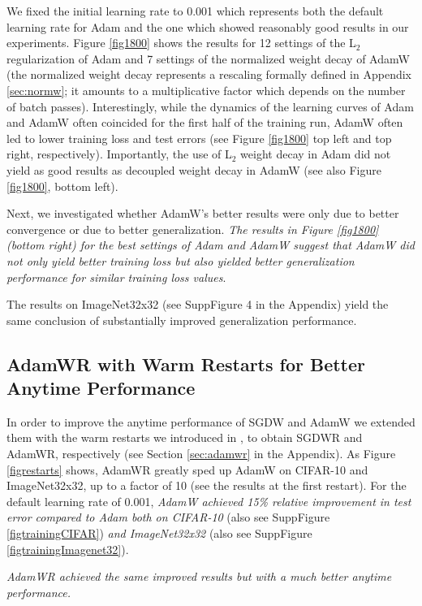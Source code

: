 We fixed the initial learning rate to 0.001 which represents both the default learning rate for Adam and the one which showed reasonably good results in our experiments. Figure \ref{fig1800} shows the results for 12 settings of the L$_2$ regularization of Adam and 7 settings of the normalized weight decay of AdamW (the normalized weight decay represents a rescaling formally defined in Appendix \ref{sec:normw}; it amounts to a multiplicative factor which depends on the number of batch passes). Interestingly, while the dynamics of the learning curves of Adam and AdamW often coincided for the first half of the training run, AdamW often led to lower training loss and test errors (see Figure \ref{fig1800} top left and top right, respectively). Importantly, the use of L$_2$ weight decay in Adam did not yield as good results as decoupled weight decay in AdamW (see also Figure \ref{fig1800}, bottom left).

Next, we investigated whether AdamW's better results were only due to better convergence or due to better generalization. 
\emph{The results in Figure \ref{fig1800} (bottom right) for the best settings of Adam and AdamW suggest that AdamW did not only yield better training loss but also yielded better generalization performance for similar training loss values}.

The results on ImageNet32x32 (see SuppFigure 4 in the Appendix) yield the same conclusion of substantially improved generalization performance. 

\subsection{AdamWR with Warm Restarts for Better Anytime Performance}

In order to improve the anytime performance of SGDW and AdamW we extended them with the warm restarts we introduced in \citet{loshchilov2016sgdr}, to obtain SGDWR and AdamWR, respectively (see Section \ref{sec:adamwr} in the Appendix). As Figure \ref{figrestarts} shows, AdamWR greatly sped up AdamW on CIFAR-10 and ImageNet32x32, up to a factor of 10 (see the results at the first restart). For the default learning rate of 0.001, \emph{AdamW achieved 15\% relative improvement in test error compared to Adam both on CIFAR-10} (also see SuppFigure  \ref{figtrainingCIFAR}) \emph{and ImageNet32x32} (also see SuppFigure \ref{figtrainingImagenet32}). 

\emph{AdamWR achieved the same improved results but with a much better anytime performance.} 

